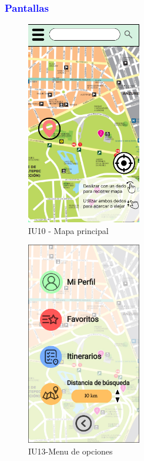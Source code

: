 \subsubsection{\textcolor{blue}{Pantallas}}
\begin{figure}[htbp]
        \centering
        \includegraphics[width= 5cm]{Pantallas Prototipo3/IU10 - Mapa principal.jpg}
        \caption{IU10 - Mapa principal}
        \label{fig:enter-label}
\end{figure}
\begin{figure}[htbp]
    \centering
    \includegraphics[width= 5cm]{Pantallas Prototipo3/IU13 Pantalla Menu de Opciones.jpg}
    \caption{IU13-Menu de opciones}
    \label{fig:enter-label}
\end{figure}

